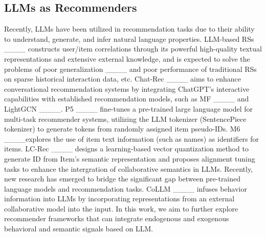 \subsection{LLMs as Recommenders}
Recently, LLMs have been utilized in recommendation tasks due to their ability to understand, generate, and infer natural language properties. LLM-based RSs ____ constructs user/item correlations through its powerful high-quality textual representations and extensive external knowledge, and is expected to solve the problems of poor generalization ____ and poor performance of traditional RSs on sparse historical interaction data, etc.
Chat-Rec ____ aims to enhance conversational recommendation systems by integrating ChatGPT’s interactive capabilities with established recommendation models, such as MF ____ and LightGCN ____. P5 ____ fine-tunes a pre-trained large language model for multi-task recommender systems, utilizing the LLM tokenizer (SentencePiece tokenizer) to generate tokens from randomly assigned item pseudo-IDs. M6 ____explores the use of item text information (such as names) as identifiers for items. LC-Rec ____ designs a learning-based vector quantization method to generate ID from Item’s semantic representation and proposes alignment tuning tasks to enhance the intergration of collaborative semantics in LLMs.
Recently, new research has emerged to bridge the significant gap between pre-trained language models and recommendation tasks. CoLLM ____ infuses behavior information into LLMs by incorporating representations from an external collaborative model into the input.
In this work, we aim to further explore recommender frameworks that can integrate endogenous and exogenous behavioral and semantic signals based on LLM.